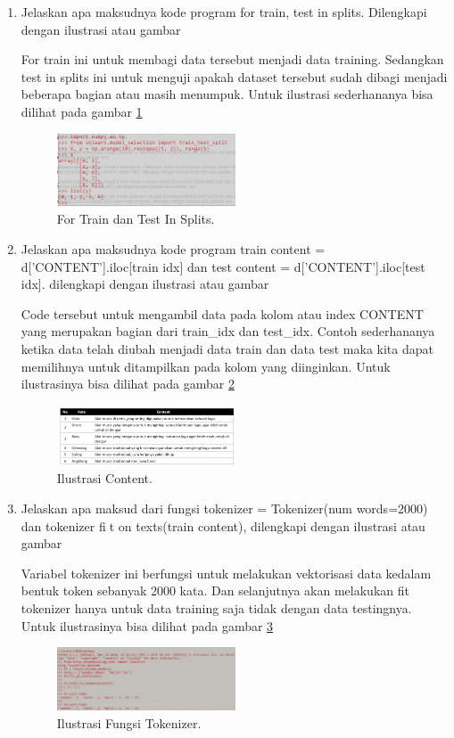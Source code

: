 \begin{enumerate}
\item Jelaskan apa maksudnya kode program for train, test in splits. Dilengkapi dengan ilustrasi atau gambar \par
For train ini untuk membagi data tersebut menjadi data training. Sedangkan test in splits ini untuk menguji apakah dataset tersebut sudah dibagi menjadi beberapa bagian atau masih menumpuk. Untuk ilustrasi sederhananya bisa dilihat pada gambar \ref{toke3}
		\begin{figure}[!htbp]
		\centerline{\includegraphics[width=0.5\textwidth]{figures/im/toke3.png}}
		\caption{For Train dan Test In Splits.}
		\label{toke3}
		\end{figure}

\item Jelaskan apa maksudnya kode program train content = d['CONTENT'].iloc[train idx] dan test content = d['CONTENT'].iloc[test idx]. dilengkapi dengan ilustrasi atau gambar \par
Code tersebut untuk mengambil data pada kolom atau index CONTENT yang merupakan bagian dari train\_idx dan test\_idx. Contoh sederhananya ketika data telah diubah menjadi data train dan data test maka kita dapat memilihnya untuk ditampilkan pada kolom yang diinginkan. Untuk ilustrasinya bisa dilihat pada gambar \ref{toke4}
		\begin{figure}[!htbp]
		\centerline{\includegraphics[width=0.5\textwidth]{figures/im/toke4.png}}
		\caption{Ilustrasi Content.}
		\label{toke4}
		\end{figure}

\item Jelaskan apa maksud dari fungsi tokenizer = Tokenizer(num words=2000) dan tokenizer fit on texts(train content), dilengkapi dengan ilustrasi atau gambar \par
Variabel tokenizer ini berfungsi untuk melakukan vektorisasi data kedalam bentuk token sebanyak 2000 kata. Dan selanjutnya akan melakukan fit tokenizer hanya untuk data training saja tidak dengan data testingnya. Untuk ilustrasinya bisa dilihat pada gambar \ref{toke5}
		\begin{figure}[!htbp]
		\centerline{\includegraphics[width=0.5\textwidth]{figures/im/toke5.png}}
		\caption{Ilustrasi Fungsi Tokenizer.}
		\label{toke5}
		\end{figure}


\end{enumerate}
